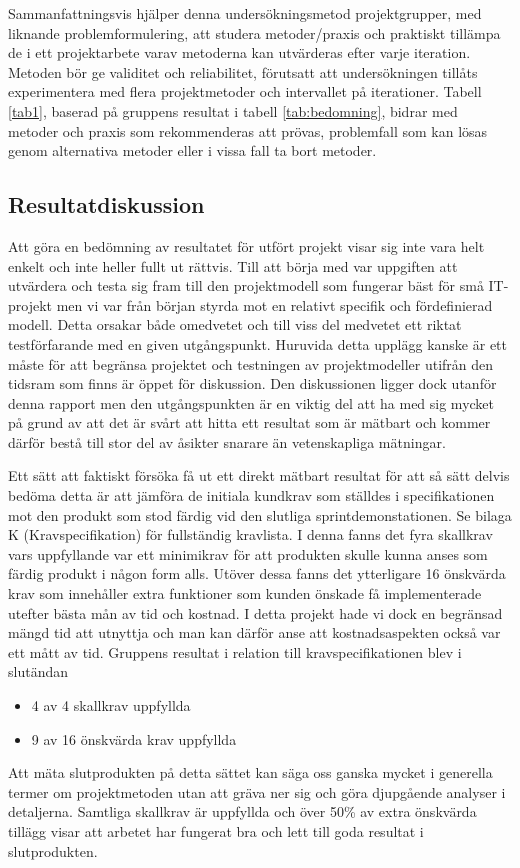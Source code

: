 \documentclass[conference]{IEEEtran}
\begin{document}
Sammanfattningsvis hjälper denna undersökningsmetod projektgrupper, med liknande problemformulering, att studera metoder/praxis och praktiskt tillämpa de i ett projektarbete varav metoderna kan utvärderas efter varje iteration. Metoden bör ge validitet och reliabilitet, förutsatt att undersökningen tillåts experimentera med flera projektmetoder och intervallet på iterationer. Tabell \ref{tab1}, baserad på gruppens resultat i tabell \ref{tab:bedomning}, bidrar med metoder och praxis som rekommenderas att prövas, problemfall som kan lösas genom alternativa metoder eller i vissa fall ta bort metoder.

\subsection{Resultatdiskussion}
Att göra en bedömning av resultatet för utfört projekt visar sig inte vara helt enkelt och inte heller fullt ut rättvis. Till att börja med var uppgiften att utvärdera och testa sig fram till den projektmodell som fungerar bäst för små IT-projekt men vi var från början styrda mot en relativt specifik och fördefinierad modell. Detta orsakar både omedvetet och till viss del medvetet ett riktat testförfarande med en given utgångspunkt. Huruvida detta upplägg kanske är ett måste för att begränsa projektet och testningen av projektmodeller utifrån den tidsram som finns är öppet för diskussion. Den diskussionen ligger dock utanför denna rapport men den utgångspunkten är en viktig del att ha med sig mycket på grund av att det är svårt att hitta ett resultat som är mätbart och kommer därför bestå till stor del av åsikter snarare än vetenskapliga mätningar.

Ett sätt att faktiskt försöka få ut ett direkt mätbart resultat för att så sätt delvis bedöma detta är att jämföra de initiala kundkrav som ställdes i specifikationen mot den produkt som stod färdig vid den slutliga sprintdemonstationen. Se bilaga K (Kravspecifikation) för fullständig kravlista. I denna fanns det fyra skallkrav vars uppfyllande var ett minimikrav för att produkten skulle kunna anses som färdig produkt i någon form alls. Utöver dessa fanns det ytterligare 16 önskvärda krav som innehåller extra funktioner som kunden önskade få implementerade utefter bästa mån av tid och kostnad. I detta projekt hade vi dock en begränsad mängd tid att utnyttja och man kan därför anse att kostnadsaspekten också var ett mått av tid. Gruppens resultat i relation till kravspecifikationen blev i slutändan
\begin{itemize}
	\item 4 av 4 skallkrav uppfyllda
	\item 9 av 16 önskvärda krav uppfyllda
\end{itemize}
Att mäta slutprodukten på detta sättet kan säga oss ganska mycket i generella termer om projektmetoden utan att gräva ner sig och göra djupgående analyser i detaljerna. Samtliga skallkrav är uppfyllda och över 50\% av extra önskvärda tillägg visar att arbetet har fungerat bra och lett till goda resultat i slutprodukten. 
\end{document}
